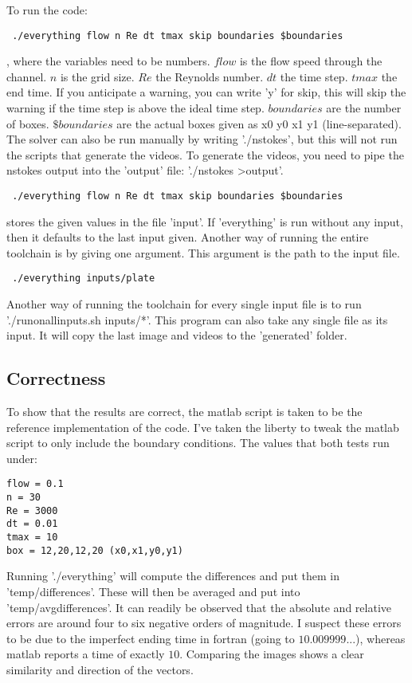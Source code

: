 \documentclass[listof=totoc]{report}
\begin{document}
To run the code:
\begin{verbatim} ./everything flow n Re dt tmax skip boundaries $boundaries \end{verbatim}, where the variables need to be numbers. $flow$ is the flow speed through the channel. $n$ is the grid size. $Re$ the Reynolds number. $dt$ the time step. $tmax$ the end time. If you anticipate a warning, you can write 'y' for skip, this will skip the warning if the time step is above the ideal time step. $boundaries$ are the number of boxes. $\$boundaries$ are the actual boxes given as x0 y0 x1 y1 (line-separated). The solver can also be run manually by writing './nstokes', but this will not run the scripts that generate the videos. To generate the videos, you need to pipe the nstokes output into the 'output' file: './nstokes \textgreater output'.
\begin{verbatim} ./everything flow n Re dt tmax skip boundaries $boundaries \end{verbatim} stores the given values in the file 'input'. If 'everything' is run without any input, then it defaults to the last input given.
Another way of running the entire toolchain is by giving one argument. This argument is the path to the input file. \begin{verbatim} ./everything inputs/plate \end{verbatim}
Another way of running the toolchain for every single input file is to run './run\textunderscore on\textunderscore all\textunderscore inputs.sh inputs/*'. This program can also take any single file as its input. It will copy the last image and videos to the 'generated' folder.

\subsection{Correctness}
To show that the results are correct, the matlab script is taken to be the reference implementation of the code. I've taken the liberty to tweak the matlab script to only include the boundary conditions. The values that both tests run under:

\begin{verbatim}
flow = 0.1
n = 30
Re = 3000
dt = 0.01
tmax = 10
box = 12,20,12,20 (x0,x1,y0,y1)
\end{verbatim}

Running './everything' will compute the differences and put them in 'temp/differences'. These will then be averaged and put into 'temp/avg\textunderscore differences'. It can readily be observed that the absolute and relative errors are around four to six negative orders of magnitude. I suspect these errors to be due to the imperfect ending time in fortran (going to $10.009999$...), whereas matlab reports a time of exactly $10$. Comparing the images shows a clear similarity and direction of the vectors.
\end{document}
